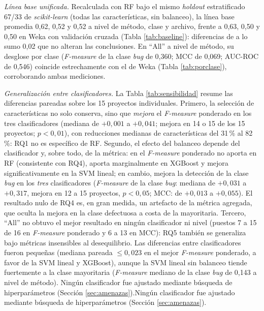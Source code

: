 \documentclass[conference,a4paper]{IEEEtran}
\newif\ifmarcarcambios
\newcommand{\cambio}[1]{\ifmarcarcambios\ifvmode\leavevmode\fi{\color{azulcambio}#1}\else#1\fi}
\begin{document}
\textit{Línea base unificada.} Recalculada con RF bajo el mismo \textit{holdout} estratificado 67/33 de \textit{scikit-learn} (todas las características, sin balanceo), la línea base promedia 0,62, 0,52 y 0,52 a nivel de método, clase y archivo, frente a 0,63, 0,50 y 0,50 en Weka con validación cruzada (Tabla \ref{tab:baseline}): diferencias de a lo sumo 0,02 que no alteran las conclusiones. En ``All'' a nivel de método, su desglose por clase (\textit{F-measure} de la clase \textit{bug} de 0,360; MCC de 0,069; AUC-ROC de 0,546) coincide estrechamente con el de Weka (Tabla \ref{tab:porclase}), corroborando ambas mediciones.

\textit{Generalización entre clasificadores.} La Tabla \ref{tab:sensibilidad} resume las diferencias pareadas sobre los 15 proyectos individuales. Primero, la selección de características no solo conserva, sino que \textit{mejora} el \textit{F-measure} ponderado en los tres clasificadores (mediana de $+0{,}001$ a $+0{,}041$; mejora en 14 o 15 de los 15 proyectos; $p<0{,}01$), con reducciones medianas de características del 31\,\% al 82\,\%: RQ1 no es específico de RF. Segundo, el efecto del balanceo depende del clasificador y, sobre todo, de la métrica: en el \textit{F-measure} ponderado no aporta en RF (consistente con RQ4), aporta marginalmente en XGBoost y mejora significativamente en la SVM lineal; en cambio, mejora la detección de la clase \textit{bug} en los \textit{tres} clasificadores (\textit{F-measure} de la clase \textit{bug}: mediana de $+0{,}031$ a $+0{,}317$, mejora en 12 a 15 proyectos, $p<0{,}05$; MCC: de $+0{,}013$ a $+0{,}055$). El resultado nulo de RQ4 es, en gran medida, un artefacto de la métrica agregada, que oculta la mejora en la clase defectuosa a costa de la mayoritaria. Tercero, ``All'' no obtuvo el mejor resultado en ningún clasificador ni nivel (puestos 7 a 15 de 16 en \textit{F-measure} ponderado y 6 a 13 en MCC): RQ5 también se generaliza bajo métricas insensibles al desequilibrio. Las diferencias entre clasificadores fueron pequeñas (mediana pareada $\leq 0{,}023$ en el mejor \textit{F-measure} ponderado, a favor de la SVM lineal y XGBoost), aunque la SVM lineal sin balanceo tiende fuertemente a la clase mayoritaria (\textit{F-measure} mediano de la clase \textit{bug} de 0,143 a nivel de método). \cambio{Ningún clasificador fue ajustado mediante búsqueda de hiperparámetros (Sección \ref{sec:amenazas}).}
\end{document}
